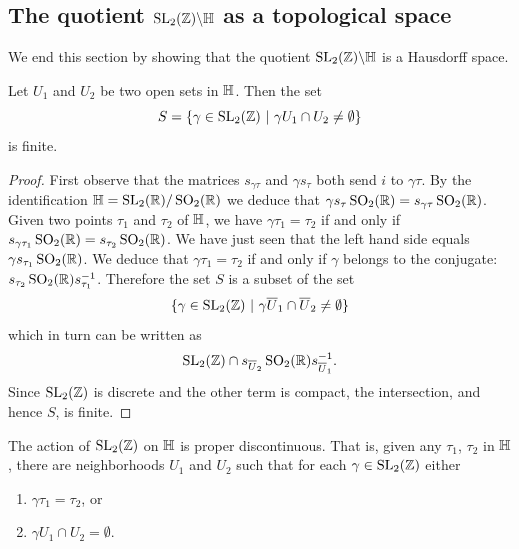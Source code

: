 \subsection{The quotient \texorpdfstring{$\operatorname{SL}_2(\mathbb{Z})\backslash \mathbb{H}$}{SL2\H} as a topological space}
We end this section by showing that the quotient $\operatorname{SL}_2(\mathbb{Z})\backslash \mathbb{H}$ is a Hausdorff space.
\begin{lemma}
  Let $U_1$ and $U_2$ be two open sets in $\mathbb{H}$. Then the set
\[
S = \{\gamma\in \operatorname{SL}_2(\mathbb{Z}) ~|~ \gamma U_1 \cap U_2 \neq \emptyset\}
\]
is finite.
\end{lemma}
\begin{proof}
  First observe that the matrices $s_{\gamma\tau}$ and $\gamma s_\tau$ both send $i$ to $\gamma\tau$. By the identification $\mathbb{H} = \operatorname{SL}_2(\mathbb{R})/\operatorname{SO}_2(\mathbb{R})$ we deduce that $\gamma s_\tau\operatorname{SO}_2(\mathbb{R})=s_{\gamma\tau}\operatorname{SO}_2(\mathbb{R})$. Given two points $\tau_1$ and $\tau_2$ of $\mathbb{H}$, we have $\gamma\tau_1 =\tau_2$ if and only if $s_{\gamma\tau_1}\operatorname{SO}_2(\mathbb{R}) = s_{\tau_2}\operatorname{SO}_2(\mathbb{R})$. We have just seen that the left hand side equals $\gamma s_{\tau_1}\operatorname{SO}_2(\mathbb{R})$. We deduce that $\gamma\tau_1=\tau_2$ if and only if $\gamma$ belongs to the conjugate: $s_{\tau_2}\operatorname{SO}_2(\mathbb{R}) s_{\tau_1}^{-1}$. Therefore the set $S$ is a subset of the set
\[
\{\gamma\in\operatorname{SL}_2(\mathbb{Z}) ~|~ \gamma \overline{U}_1 \cap \overline{U}_2 \neq \emptyset\}
\]
which in turn can be written as
\[
\operatorname{SL}_2(\mathbb{Z})\cap s_{\overline{U}_2} \operatorname{SO}_2(\mathbb{R}) s_{\overline{U}_1}^{-1}.
\]
Since $\operatorname{SL}_2(\mathbb{Z})$ is discrete and the other term is compact, the intersection, and hence $S$, is finite.
\end{proof}
\begin{proposition}
  The action of $\operatorname{SL}_2(\mathbb{Z})$ on $\mathbb{H}$ is proper discontinuous. That is, given any $\tau_1$, $\tau_2$ in $\mathbb{H}$, there are neighborhoods $U_1$ and $U_2$ such that for each $\gamma\in \operatorname{SL}_2(\mathbb{Z})$ either
  \begin{enumerate}
  \item $\gamma\tau_1=\tau_2$, or
  \item $\gamma U_1\cap U_2 = \emptyset$.
  \end{enumerate}
\end{proposition}
